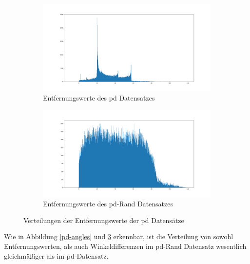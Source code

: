 \begin{figure}[H]
	\centering
	\begin{subfigure}[h]{0.5\textwidth}
		\centering
		\includegraphics[width=\linewidth]{kapitel4/images/plots/pd-distances.png}
		\caption{Entfernungswerte des \acs{pd} Datensatzes}
		\label{pd-drive-distances}
	\end{subfigure}%
	\begin{subfigure}[h]{0.5\textwidth}
		\centering
		\includegraphics[width=\linewidth]{kapitel4/images/plots/pd-rand-distances.png}
		\caption{Entfernungswerte des \acs{pd}-Rand Datensatzes}
		\label{pd-rand-distances}
	\end{subfigure}
	\caption{Verteilungen der Entfernungswerte der \acs{pd} Datensätze}
	\label{pd-distances}
\end{figure}

Wie in Abbildung \ref{pd-angles} und \ref{pd-distances} erkennbar, ist die Verteilung von sowohl Entfernungswerten, als auch Winkeldifferenzen im  \glqq \acs{pd}-Rand\grqq{} Datensatz wesentlich gleichmäßiger als im \glqq \acs{pd}\grqq-Datensatz.


